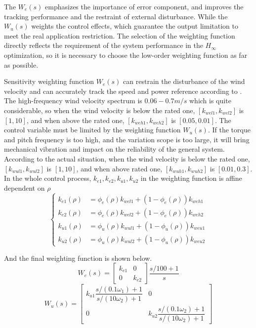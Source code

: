 \documentclass[english]{cccconf}
\begin{document}
The $W_e(s)$ emphasizes the importance of error component, and improves the
tracking performance and the restraint of external disturbance. While the
$W_u(s)$ weights the control effects, which guarantee the output limitation
to meet the real application restriction. The selection of the weighting
function directly reflects the requirement of the system performance
in the $H_\infty$ optimization, so it is necessary to choose the
low-order weighting function as far as possible.

Sensitivity weighting function $W_e(s)$ can restrain the disturbance of
the wind velocity and can accurately track the speed and power
reference according to \cite{lit:10}.
The high-frequency wind velocity spectrum is $0.06 - 0.7m/s$ which is
quite considerable, so when the wind velocity is below the rated one,
$[k_{wel1}, k_{wel2}]$ is $[1, 10]$, and when above the rated one,
$[k_{weh1}, k_{weh2}]$ is $[0.05, 0.01]$. The control variable must be
limited by the weighting function $W_u(s)$.
If the torque and pitch
frequency is too high, and the variation scope is too large, it will
bring mechanical vibration and impact on the reliability of the general
system. According to the actual situation, when the wind velocity is
below the rated one, $[k_{wul1}, k_{wul2}]$ is $[1, 10]$, and when above
rated one, $[k_{wuh1}, k_{wuh2}]$ is $[0.01, 0.3]$. In the whole control
process, $k_{e1}, k_{e2}, k_{u1}, k_{u2}$ in the weighting function
is affine dependent on $\rho$
\begin{equation}\label{e:13}
  \begin{cases}
    k_{e1}(\rho) & = \phi_e(\rho)k_{wel1} + (1 - \phi_e(\rho))k_{weh1}  \\
    k_{e2}(\rho) & = \phi_e(\rho)k_{wel2} + (1 - \phi_e(\rho))k_{weh2}  \\
    k_{u1}(\rho) & = \phi_u(\rho)k_{wul1} + (1 - \phi_u(\rho))k_{weu1}  \\
    k_{u2}(\rho) & = \phi_u(\rho)k_{wul2} + (1 - \phi_u(\rho))k_{weu2}
  \end{cases}
\end{equation}

And the final weighting function is shown below.
\begin{equation}\label{e:14}
  W_e(s) = \begin{bmatrix}
            k_{e1} & 0 \\
            0 & k_{e2}
            \end{bmatrix}
            \dfrac{s/100+1}{s}
\end{equation}
\begin{equation}\label{e:15}
  W_u(s) = \begin{bmatrix}
    k_{u1}\dfrac{s/(0.1\omega_1)+1}{s/(10\omega_2)+1}   &  0 \\
    0   &   k_{u2}\dfrac{s/(0.1\omega_2)+1}{s/(10\omega_2)+1}
  \end{bmatrix}
\end{equation}
\end{document}
